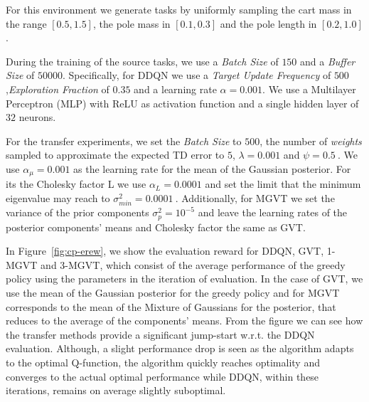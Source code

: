 \documentclass{article}
\begin{document}
For this environment we generate tasks by uniformly sampling the cart mass in the range $\left[0.5,1.5\right]$, the pole mass in $\left[0.1,0.3\right]$ and the pole length in $\left[0.2,1.0\right]$. 

During the training of the source tasks, we use a \textit{Batch Size} of $150$ and a \textit{Buffer Size} of $50000$. Specifically, for DDQN we use a \textit{Target Update Frequency} of $500$,\textit{Exploration Fraction} of $0.35$ and a learning rate $\alpha=0.001$. We use a Multilayer Perceptron (MLP) with ReLU as activation function and a single hidden layer of $32$ neurons.

For the transfer experiments, we set the \textit{Batch Size} to $500$, the number of \textit{weights} sampled to approximate the expected TD error to $5$, $\lambda=0.001$ and $\psi=0.5\ $. We use $\alpha_{\mu}=0.001$ as the learning rate for the mean of the Gaussian posterior. For its the Cholesky factor L we use $\alpha_L=0.0001$ and set the limit that the minimum eigenvalue may reach to $\sigma_{min}^2=0.0001\ $. Additionally, for MGVT we set the variance of the prior components $\sigma_p^2=10^{-5}$ and leave the learning rates of the posterior components' means and Cholesky factor the same as GVT.

In Figure~\ref{fig:cp-erew}, we show the evaluation reward for DDQN, GVT, 1-MGVT and 3-MGVT, which consist of the average performance of the greedy policy using the parameters in the iteration of evaluation. In the case of GVT, we use the mean of the Gaussian posterior for the greedy policy and for MGVT corresponds to the mean of the Mixture of Gaussians for the posterior, that reduces to the average of the components' means. From the figure we can see how the transfer methods provide a significant jump-start w.r.t. the DDQN evaluation. Although, a slight performance drop is seen as the algorithm adapts to the optimal Q-function, the algorithm quickly reaches optimality and converges to the actual optimal performance while DDQN, within these iterations, remains on average slightly suboptimal. 
\end{document}
